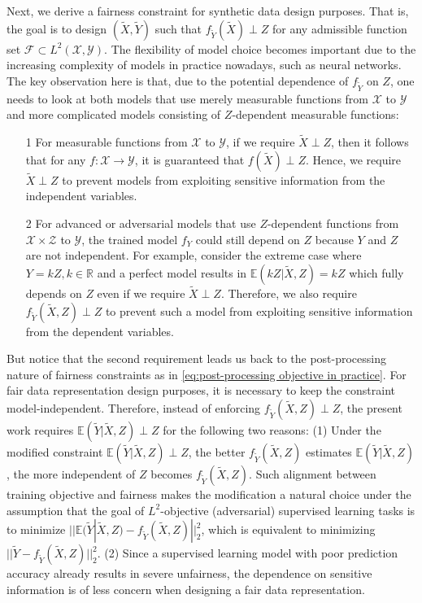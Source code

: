 \documentclass[twoside,11pt]{article}
\begin{document}
Next, we derive a fairness constraint for synthetic data design purposes. That is, the goal is to design $(\tilde{X},\tilde{Y})$ such that $f_{\tilde{Y}}(\tilde{X}) \perp Z$ for any admissible function set $\mathcal{F} \subset L^2(\mathcal{X},\mathcal{Y})$.  The flexibility of model choice becomes important due to the increasing complexity of models in practice nowadays, such as neural networks. The key observation here is that, due to the potential dependence of $f_{\tilde{Y}}$ on $Z$, one needs to look at both models that use merely measurable functions from $\mathcal{X}$ to $\mathcal{Y}$ and more complicated models consisting of $Z$-dependent measurable functions:
\begin{itemize}
\item[1] For measurable functions from $\mathcal{X}$ to $\mathcal{Y}$, if we require $\tilde{X} \perp Z$, then it follows that for any $f: \mathcal{X} \rightarrow \mathcal{Y}$, it is guaranteed that $f(\tilde{X}) \perp Z$. Hence, we require $\tilde{X} \perp Z$ to prevent models from exploiting sensitive information from the independent variables.
\item[2] For advanced or adversarial models that use $Z$-dependent functions from $\mathcal{X} \times \mathcal{Z}$ to $\mathcal{Y}$, the trained model $f_{Y}$ could still depend on $Z$ because $Y$ and $Z$ are not independent. For example, consider the extreme case where $Y = kZ, k \in \mathbb{R}$ and a perfect model results in $\mathbb{E}(kZ|\tilde{X},Z) = kZ$ which fully depends on $Z$ even if we require $\tilde{X} \perp Z$. Therefore, we also require $f_{\tilde{Y}}(\tilde{X},Z) \perp Z$ to prevent such a model from exploiting sensitive information from the dependent variables.
\end{itemize}
But notice that the second requirement leads us back to the post-processing nature of fairness constraints as in \eqref{eq:post-processing objective in practice}. For fair data representation design purposes,  it is necessary to keep the constraint model-independent. Therefore, instead of enforcing $f_{\tilde{Y}}(\tilde{X},Z) \perp Z$, the present work requires $\mathbb{E}(\tilde{Y}|\tilde{X},Z) \perp Z$ for the following two reasons: (1) Under the modified constraint $\mathbb{E}(\tilde{Y}|\tilde{X},Z) \perp Z$, the better $f_{\tilde{Y}}(\tilde{X},Z)$ estimates $\mathbb{E}(\tilde{Y}|\tilde{X},Z)$, the more independent of $Z$ becomes $f_{\tilde{Y}}(\tilde{X},Z)$. Such alignment between training objective and fairness makes the modification a natural choice under the assumption that the goal of $L^2$-objective (adversarial) supervised learning tasks is to minimize $||\mathbb{E}(\tilde{Y}|\tilde{X},Z) - f_{\tilde{Y}}(\tilde{X},Z)||^2_2$, which is equivalent to minimizing $||\tilde{Y} - f_{\tilde{Y}}(\tilde{X},Z)||^2_2$. (2) Since a supervised learning model with poor prediction accuracy already results in severe unfairness, the dependence on sensitive information is of less concern when designing a fair data representation. 
\end{document}
